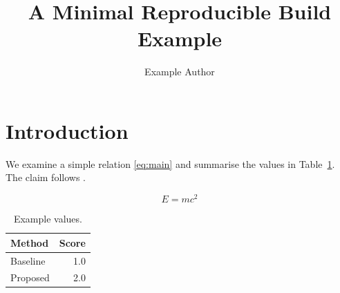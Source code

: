 \documentclass{article}
\title{A Minimal Reproducible Build Example}
\author{Example Author}
\date{}
\begin{document}
\maketitle

\section{Introduction}
We examine a simple relation \eqref{eq:main} and summarise the values in
Table~\ref{tab:result}.  The claim follows \citet{doe2020}.

\begin{equation}
  E = m c^{2}
  \label{eq:main}
\end{equation}

\begin{table}[ht]
  \centering
  \caption{Example values.}
  \label{tab:result}
  \begin{tabular}{lr}
    \toprule
    Method & Score \\
    \midrule
    Baseline & 1.0 \\
    Proposed & 2.0 \\
    \bottomrule
  \end{tabular}
\end{table}



\end{document}
